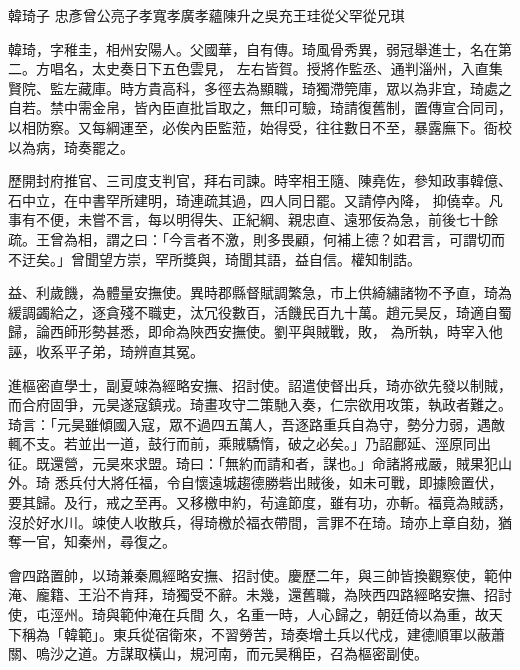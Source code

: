 
\begin{pinyinscope}

 韓琦子
 忠彥曾公亮子孝寬孝廣孝蘊陳升之吳充王珪從父罕從兄琪



 韓琦，字稚圭，相州安陽人。父國華，自有傳。琦風骨秀異，弱冠舉進士，名在第二。方唱名，太史奏日下五色雲見，
 左右皆賀。授將作監丞、通判淄州，入直集賢院、監左藏庫。時方貴高科，多徑去為顯職，琦獨滯筦庫，眾以為非宜，琦處之自若。禁中需金帛，皆內臣直批旨取之，無印可驗，琦請復舊制，置傳宣合同司，以相防察。又每綱運至，必俟內臣監蒞，始得受，往往數日不至，暴露廡下。衙校以為病，琦奏罷之。



 歷開封府推官、三司度支判官，拜右司諫。時宰相王隨、陳堯佐，參知政事韓億、石中立，在中書罕所建明，琦連疏其過，四人同日罷。又請停內降，
 抑僥幸。凡事有不便，未嘗不言，每以明得失、正紀綱、親忠直、遠邪佞為急，前後七十餘疏。王曾為相，謂之曰：「今言者不激，則多畏顧，何補上德？如君言，可謂切而不迂矣。」曾聞望方崇，罕所獎與，琦聞其語，益自信。權知制誥。



 益、利歲饑，為體量安撫使。異時郡縣督賦調繁急，市上供綺繡諸物不予直，琦為緩調蠲給之，逐貪殘不職吏，汰冗役數百，活饑民百九十萬。趙元昊反，琦適自蜀歸，論西師形勢甚悉，即命為陜西安撫使。劉平與賊戰，敗，
 為所執，時宰入他誣，收系平子弟，琦辨直其冤。



 進樞密直學士，副夏竦為經略安撫、招討使。詔遣使督出兵，琦亦欲先發以制賊，而合府固爭，元昊遂寇鎮戎。琦畫攻守二策馳入奏，仁宗欲用攻策，執政者難之。琦言：「元昊雖傾國入寇，眾不過四五萬人，吾逐路重兵自為守，勢分力弱，遇敵輒不支。若並出一道，鼓行而前，乘賊驕惰，破之必矣。」乃詔鄜延、涇原同出征。既還營，元昊來求盟。琦曰：「無約而請和者，謀也。」命諸將戒嚴，賊果犯山外。琦
 悉兵付大將任福，令自懷遠城趨德勝砦出賊後，如未可戰，即據險置伏，要其歸。及行，戒之至再。又移檄申約，茍違節度，雖有功，亦斬。福竟為賊誘，沒於好水川。竦使人收散兵，得琦檄於福衣帶間，言罪不在琦。琦亦上章自劾，猶奪一官，知秦州，尋復之。



 會四路置帥，以琦兼秦鳳經略安撫、招討使。慶歷二年，與三帥皆換觀察使，範仲淹、龐籍、王沿不肯拜，琦獨受不辭。未幾，還舊職，為陜西四路經略安撫、招討使，屯涇州。琦與範仲淹在兵間
 久，名重一時，人心歸之，朝廷倚以為重，故天下稱為「韓範」。東兵從宿衛來，不習勞苦，琦奏增土兵以代戍，建德順軍以蔽蕭關、嗚沙之道。方謀取橫山，規河南，而元昊稱臣，召為樞密副使。




\end{pinyinscope}
